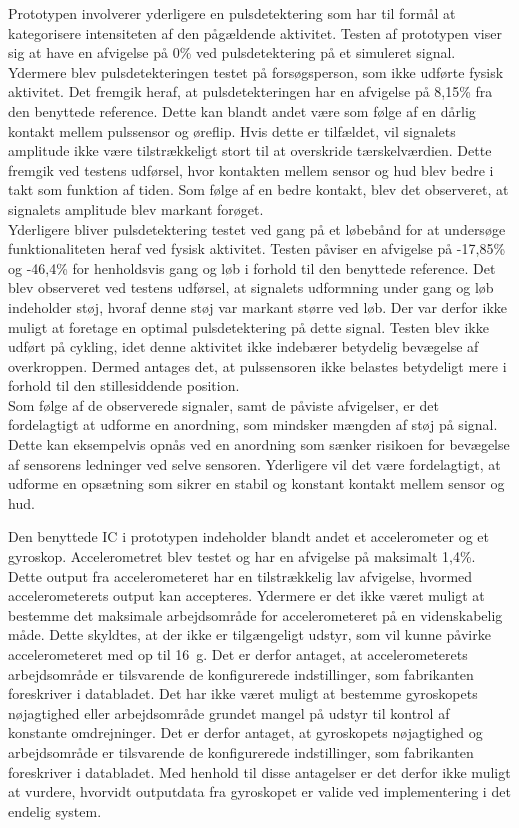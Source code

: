 Prototypen involverer yderligere en pulsdetektering som har til formål at kategorisere intensiteten af den pågældende aktivitet.
Testen af prototypen viser sig at have en afvigelse på 0\% ved pulsdetektering på et simuleret signal. Ydermere blev pulsdetekteringen testet på forsøgsperson, som ikke udførte fysisk aktivitet. Det fremgik heraf, at pulsdetekteringen har en afvigelse på 8,15\% fra den benyttede reference. Dette kan blandt andet være som følge af en dårlig kontakt mellem pulssensor og øreflip. Hvis dette er tilfældet, vil signalets amplitude ikke være tilstrækkeligt stort til at overskride tærskelværdien. Dette fremgik ved testens udførsel, hvor kontakten mellem sensor og hud blev bedre i takt som funktion af tiden. Som følge af en bedre kontakt, blev det observeret, at signalets amplitude blev markant forøget. \\
Yderligere bliver pulsdetektering testet ved gang på et løbebånd for at undersøge funktionaliteten heraf ved fysisk aktivitet. Testen påviser en afvigelse på -17,85\% og -46,4\% for henholdsvis gang og løb i forhold til den benyttede reference. Det blev observeret ved testens udførsel, at signalets udformning under gang og løb indeholder støj, hvoraf denne støj var markant større ved løb. Der var derfor ikke muligt at foretage en optimal pulsdetektering på dette signal. Testen blev ikke udført på cykling, idet denne aktivitet ikke indebærer betydelig bevægelse af overkroppen. Dermed antages det, at pulssensoren ikke belastes betydeligt mere i forhold til den stillesiddende position. \\
Som følge af de observerede signaler, samt de påviste afvigelser, er det fordelagtigt at udforme en anordning, som mindsker mængden af støj på signal. Dette kan eksempelvis opnås ved en anordning som sænker risikoen for bevægelse af sensorens ledninger ved selve sensoren. Yderligere vil det være fordelagtigt, at udforme en opsætning som sikrer en stabil og konstant kontakt mellem sensor og hud. 

Den benyttede IC i prototypen indeholder blandt andet et accelerometer og et gyroskop. Accelerometret blev testet og har en afvigelse på maksimalt 1,4\%. Dette output fra accelerometeret har en tilstrækkelig lav afvigelse, hvormed accelerometerets output kan accepteres. Ydermere er det ikke været muligt at bestemme det maksimale arbejdsområde for accelerometeret på en videnskabelig måde. Dette skyldtes, at der ikke er tilgængeligt udstyr, som vil kunne påvirke accelerometeret med op til 16~g. Det er derfor antaget, at accelerometerets arbejdsområde er tilsvarende de konfigurerede indstillinger, som fabrikanten foreskriver i databladet. Det har ikke været muligt at bestemme gyroskopets nøjagtighed eller arbejdsområde grundet mangel på udstyr til kontrol af konstante omdrejninger. Det er derfor antaget, at gyroskopets nøjagtighed og arbejdsområde er tilsvarende de konfigurerede indstillinger, som fabrikanten foreskriver i databladet. Med henhold til disse antagelser er det derfor ikke muligt at vurdere, hvorvidt outputdata fra gyroskopet er valide ved implementering i det endelig system. 

